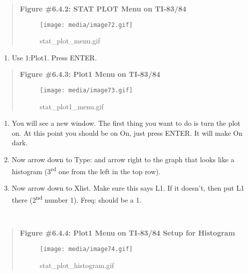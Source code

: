 \documentclass[]{book}
\providecommand{\tightlist}{%
  \setlength{\itemsep}{0pt}\setlength{\parskip}{0pt}}
\begin{document}
\begin{quote}
\textbf{Figure \#6.4.2: STAT PLOT Menu on TI-83/84}

\begin{figure}
\centering
\texttt{[image: media/image72.gif]}
\caption{stat\_plot\_menu.gif}
\end{figure}
\end{quote}

\begin{enumerate}
\def\labelenumi{\arabic{enumi}.}
\setcounter{enumi}{3}
\tightlist
\item
  Use 1:Plot1. Press ENTER.
\end{enumerate}

\begin{quote}
\textbf{Figure \#6.4.3: Plot1 Menu on TI-83/84}

\begin{figure}
\centering
\texttt{[image: media/image73.gif]}
\caption{stat\_plot1\_menu.gif}
\end{figure}
\end{quote}

\begin{enumerate}
\def\labelenumi{\arabic{enumi}.}
\setcounter{enumi}{4}
\item
  You will see a new window. The first thing you want to do is turn
  the plot on. At this point you should be on On, just press ENTER. It
  will make On dark.
\item
  Now arrow down to Type: and arrow right to the graph that looks like
  a histogram (3\textsuperscript{rd} one from the left in the top row).
\item
  Now arrow down to Xlist. Make sure this says L1. If it doesn't, then
  put L1 there (2\textsuperscript{nd} number 1). Freq: should be a 1.
\end{enumerate}

\textbf{\\
}

\begin{quote}
\textbf{Figure \#6.4.4: Plot1 Menu on TI-83/84 Setup for Histogram}

\begin{figure}
\centering
\texttt{[image: media/image74.gif]}
\caption{stat\_plot\_histogram.gif}
\end{figure}
\end{quote}
\end{document}
